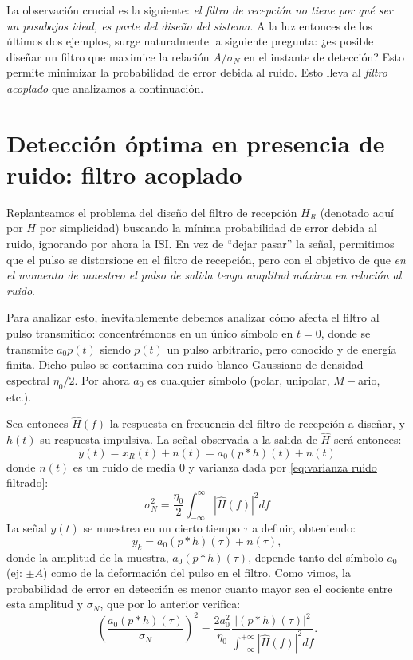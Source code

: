 La observación crucial es la siguiente: \emph{el filtro de recepción no tiene por qué ser un pasabajos ideal, es parte del diseño del sistema}. A la luz entonces de los últimos dos ejemplos, surge naturalmente la siguiente pregunta: ¿es posible diseñar un filtro que maximice la relación $A/\sigma_N$ en el instante de detección? Esto permite minimizar la probabilidad de error debida al ruido. Esto lleva al \emph{filtro acoplado} que analizamos a continuación.

\section{Detección óptima en presencia de ruido: filtro acoplado}\label{sec:filtro acoplado}

Replanteamos el problema del diseño del filtro de recepción $H_R$ (denotado aquí por $H$ por simplicidad) buscando la mínima probabilidad de error debida al ruido, ignorando por ahora la ISI. En vez de ``dejar pasar'' la señal, permitimos que el pulso se distorsione en el filtro de recepción, pero con el objetivo de que \emph{en el momento de muestreo el pulso de salida tenga amplitud máxima en relación al ruido}.

Para analizar esto, inevitablemente debemos analizar cómo afecta el filtro al pulso transmitido: concentrémonos en un único símbolo en $t=0$, donde se transmite $a_0 p(t)$ siendo $p(t)$ un pulso arbitrario, pero conocido y de energía finita. Dicho pulso se contamina con ruido blanco Gaussiano de densidad espectral $\eta_0/2$. Por ahora $a_0$ es cualquier símbolo (polar, unipolar, $M-$ario, etc.).

Sea entonces $\hat{H}(f)$ la respuesta en frecuencia del filtro de recepción a diseñar, y $h(t)$ su respuesta impulsiva. La señal observada a la salida de $\hat{H}$ será entonces:
\begin{equation*}
    y(t) = x_R(t) + n(t) = a_0 (p*h)(t) + n(t)
\end{equation*}
donde $n(t)$ es un ruido de media $0$ y varianza dada por \eqref{eq:varianza ruido filtrado}:
\begin{equation*}
    \sigma_N^2 = \frac{\eta_0}{2}\int_{-\infty}^\infty |\hat{H}(f)|^2df
\end{equation*}
La señal $y(t)$ se muestrea en un cierto tiempo $\tau$ a definir, obteniendo:
\begin{equation*}
    y_k = a_0 (p*h) (\tau) + n(\tau),
\end{equation*}
donde la amplitud de la muestra, $a_0 (p*h)(\tau)$, depende tanto del símbolo $a_0$ (ej: $\pm A$) como de la deformación del pulso en el filtro. Como vimos, la probabilidad de error en detección es menor cuanto mayor sea el cociente entre esta amplitud y $\sigma_N$, que por lo anterior verifica:
\begin{equation}\label{eq:filtro acoplado 1}
    \left(\frac{a_0 (p*h)(\tau)}{\sigma_N}\right)^2 = \frac{2 a_0^2}{\eta_0}\frac{|(p*h)(\tau)|^2}{\int_{-\infty}^{+\infty} |\hat{H}(f)|^2 df}.
\end{equation}

